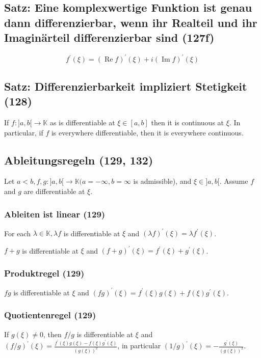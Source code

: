 \subsection{Satz: Eine komplexwertige Funktion ist genau dann differenzierbar, wenn ihr Realteil und ihr Imaginärteil differenzierbar sind (127f)}
\begin{equation}
f ^ { \prime } ( \xi ) = ( \operatorname{Re} f ) ^ { \prime } ( \xi ) + i ( \operatorname{Im} f ) ^ { \prime } ( \xi )
\end{equation}

\subsection{Satz: Differenzierbarkeit impliziert Stetigkeit (128)}
If $f : ] a ,b [ \rightarrow \mathbb { K }$ as is differentiable at $\xi \in [ a ,b ]$ then it is
continuous at $\xi$. In particular, if $f$ is everywhere differentiable, then it is everywhere continuous. 
 
\subsection{Ableitungsregeln (129, 132)}
Let $a < b ,f,g : ] a ,b [ \rightarrow \mathbb { K } ( a = - \infty ,b = \infty$ is admissible), and $\xi \in ] a ,b [$. Assume $f$ and $g$ are differentiable at $\xi$.
\subsubsection{Ableiten ist linear (129)}
For each $\lambda \in \mathbb { K } ,\lambda f$ is differentiable at $\xi$ and $( \lambda f ) ^ { \prime } ( \xi ) = \lambda f ^ { \prime } ( \xi )$.

$f + g$ is differentiable at $\xi$ and $( f + g ) ^ { \prime } ( \xi ) = f ^ { \prime } ( \xi ) + g ^ { \prime } ( \xi )$.
\subsubsection{Produktregel (129)}
$fg$ is differentiable at $\xi$ and $( f g ) ^ { \prime } ( \xi ) = f ^ { \prime } ( \xi ) g ( \xi ) + f ( \xi ) g ^ { \prime } ( \xi )$.
\subsubsection{Quotientenregel (129)}
If $g ( \xi ) \neq 0$, then $f/g$ is differentiable at $\xi$ and 
$( f / g ) ^ { \prime } ( \xi ) = \frac { f ^ { \prime } ( \xi ) g ( \xi ) - f ( \xi ) g ^ { \prime } ( \xi ) } { ( g ( \xi ) ) ^ { 2} }$, in particular $( 1/ g ) ^ { \prime } ( \xi ) = - \frac { g ^ { \prime } ( \xi ) } { ( g ( \xi ) ) ^ { 2} }$.
